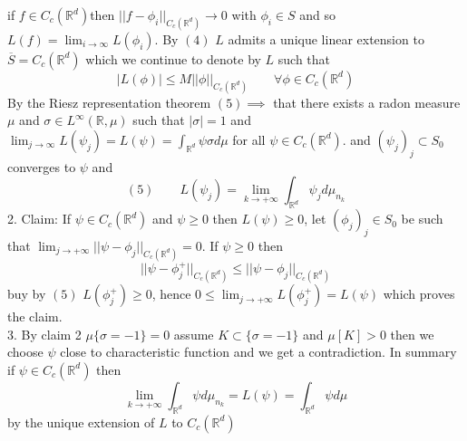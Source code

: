 \documentclass[11pt]{article}
\begin{document}
if $f \in C_c( \mathbb{R}^{d}) $then $||f - \phi_i||_{C_c( \mathbb{R}^{d})} \rightarrow 0 $ with $\phi_i \in S$ and so $L(f) = \lim_{i \to \infty}L(\phi_i)$.
By $(4)$ $L$ admits a unique linear extension to $\overline{ S} = C_c( \mathbb{R}^{d})$ which we continue to denote by $L$ such that 
 \[
     |L(\phi)| \le M ||\phi||_{C_c( \mathbb{R}^{d})} \qquad \forall  \phi \in C_c( \mathbb{R}^{d})
\] 
By the Riesz representation theorem $(5) \implies $ that there exists a radon measure  $\mu$ and $\sigma \in L^{\infty} ( \mathbb{R}, \mu)$
such that $|\sigma| = 1$ and 
$\lim_{j\to \infty} L(\psi_j) = L(\psi) = \int_{ \mathbb{R}^{d}}^{} \psi \sigma d \mu$ for all $\psi \in C_c( \mathbb{R}^{d})$.
and $(\psi_j)_j \subset S_0$ converges to $\psi$ and 
 \[
     (5) \qquad  L(\psi_j) = \lim_{k\to +\infty} \int_{ \mathbb{R}^{d}}^{} \psi_j d \mu_{n_k}
\] 
2. Claim: If $\psi \in C_c( \mathbb{R}^{d}) $ and $\psi \ge 0$ then  $L(\psi) \ge 0$, let  $(\phi_j)_j \in S_0$ be such that $\lim_{j\to +\infty} ||\psi - \phi_j||_{C_c( \mathbb{R}^{d})} = 0$.
If $\psi \ge 0$ then 
 \[
     ||\psi - \phi_j^{+} ||_{C_c( \mathbb{R}^{d})} \le ||\psi - \phi_j||_{C_c( \mathbb{R}^{d})}
\] 
buy by $(5)$  $L( \phi_j^{+}) \ge 0$, hence $0 \le \lim_{j\to +\infty}L( \phi_j^{+}) = L(\psi)$ which proves the claim.\\
3. By claim 2  $\mu \{\sigma = -1\} = 0$ assume $K \subset \{\sigma = -1\}$ and $\mu[K] > 0$ then we choose $\psi$ close to characteristic function and we get a contradiction.
In summary if $\psi \in C_c( \mathbb{R}^{d})$ then
\[
    \lim_{k\to +\infty} \int_{ \mathbb{R}^{d}}^{}\psi d \mu_{n_k} = L(\psi) = \int_{ \mathbb{R}^{d }}^{}\psi d \mu
\] 
by the unique extension of $L$ to $C_c( \mathbb{R}^{d})$
\end{document}
